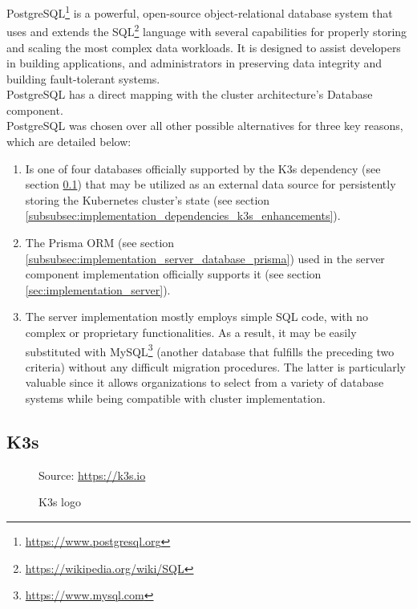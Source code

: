 PostgreSQL\footnote{\url{https://www.postgresql.org}} is a powerful, open-source
object-relational database system that uses and extends the SQL\footnote{\url{https://wikipedia.org/wiki/SQL}}
language with several capabilities for properly storing and scaling the most complex
data workloads. It is designed to assist developers in building applications, and
administrators in preserving data integrity and building fault-tolerant systems\cite{postgresql}.
\\ %
PostgreSQL has a direct mapping with the cluster architecture's Database
component. \\ %
PostgreSQL was chosen over all other possible alternatives for three key reasons,
which are detailed below:
\begin{enumerate}
  \item Is one of four databases officially supported by the K3s dependency (see
    section \ref{subsec:implementation_dependencies_k3s}) that may be utilized as
    an external data source for persistently storing the Kubernetes cluster's state
    (see section \ref{subsubsec:implementation_dependencies_k3s_enhancements}).

  \item The Prisma ORM (see section
    \ref{subsubsec:implementation_server_database_prisma}) used in the server component
    implementation officially supports it (see section
    \ref{sec:implementation_server}).

  \item The server implementation mostly employs simple SQL code, with no
    complex or proprietary functionalities. As a result, it may be easily
    substituted with MySQL\footnote{\url{https://www.mysql.com}} (another database
    that fulfills the preceding two criteria) without any difficult migration
    procedures. The latter is particularly valuable since it allows organizations
    to select from a variety of database systems while being compatible with cluster
    implementation.
\end{enumerate}

\subsection{K3s}
\label{subsec:implementation_dependencies_k3s}

\begin{figure} %
  \centering
  \def\stackalignment{l} %
  {\scriptsize \parbox[t]{\linewidth}{ Source: \url{https://k3s.io}} }
  \caption{K3s logo}
\end{figure}

